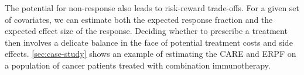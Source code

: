 The potential for non-response also leads to risk-reward trade-offs. For a given set of covariates, we can estimate both the expected response fraction and the expected effect size of the response. Deciding whether to prescribe a treatment then involves a delicate balance in the face of potential treatment costs and side effects. \cref{sec:case-study} shows an example of estimating the CARE and ERPF on a population of cancer patients treated with combination immunotherapy.


%
%


































